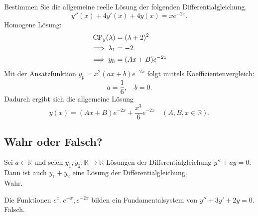 Bestimmen Sie die allgemeine reelle Lösung der folgenden Differentialgleichung.
\begin{displaymath}
  y''(x) + 4y'(x) + 4y(x) = xe^{-2x}.
\end{displaymath}
Homogene Lösung:
\begin{align*}
  \operatorname{CP}_y(\lambda) &= (\lambda + 2)^2\\
  \implies \lambda_1 &= -2\\
  \implies y_h &= (Ax + B)e^{-2x}
\end{align*}
Mit der Ansatzfunktion $y_p = x^2(ax + b)e^{-2x}$ folgt mittels Koeffizientenvergleich:
\begin{displaymath}
  a = \frac{1}{6}, \quad b = 0.
\end{displaymath}
Dadurch ergibt sich die allgemeine Lösung
\begin{displaymath}
  y(x) = (Ax + B) e^{-2x} + \frac{x^3}{6}e^{-2x} \quad (A,B,x \in \mathbb{R}).
\end{displaymath}

\subsection{Wahr oder Falsch?}
Sei $a \in \mathbb{R}$ und seien $y_1, y_2 : \mathbb{R} \to \mathbb{R}$ Lösungen der Differentialgleichung $y'' + ay = 0$.
Dann ist auch $y_1 + y_2$ eine Lösung der Differentialgleichung.\\
Wahr.

Die Funktionen $e^x, e^{-x}, e^{-2x}$ bilden ein Fundamentalsystem von $y'' + 3y' + 2y = 0$.\\
Falsch.